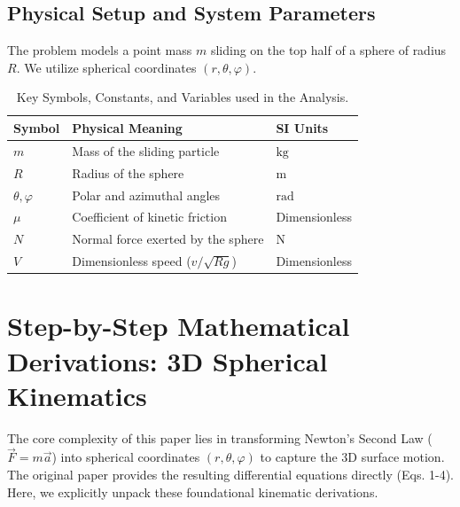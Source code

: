 \documentclass[11pt,letterpaper]{article}
\begin{document}
\subsection{Physical Setup and System Parameters}
The problem models a point mass $m$ sliding on the top half of a sphere of radius $R$. We utilize spherical coordinates $(r, \theta, \varphi)$. 

\begin{table}[h!]
\centering
\caption{Key Symbols, Constants, and Variables used in the Analysis.}
\label{tab:variables}
\begin{tabular}{lll}
\toprule
\textbf{Symbol} & \textbf{Physical Meaning} & \textbf{SI Units} \\
\midrule
$m$ & Mass of the sliding particle & $\text{kg}$ \\
$R$ & Radius of the sphere & $\text{m}$ \\
$\theta, \varphi$ & Polar and azimuthal angles & $\text{rad}$ \\
$\mu$ & Coefficient of kinetic friction & Dimensionless \\
$N$ & Normal force exerted by the sphere & $\text{N}$ \\
$V$ & Dimensionless speed ($v/\sqrt{Rg}$) & Dimensionless \\
\bottomrule
\end{tabular}
\end{table}

\section{Step-by-Step Mathematical Derivations: 3D Spherical Kinematics}

The core complexity of this paper lies in transforming Newton's Second Law ($\vec{F} = m\vec{a}$) into spherical coordinates $(r, \theta, \varphi)$ to capture the 3D surface motion. The original paper provides the resulting differential equations directly (Eqs. 1-4). Here, we explicitly unpack these foundational kinematic derivations.
\end{document}

